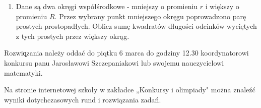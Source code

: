 \documentclass[10pt]{article}
\begin{document}
\begin{enumerate}
  \item Dane są dwa okręgi współśrodkowe - mniejszy o promieniu \(r\) i większy o promieniu \(R\). Przez wybrany punkt mniejszego okręgu poprowadzono parę prostych prostopadłych. Oblicz sumę kwadratów długości odcinków wyciętych z tych prostych przez większy okrąg.
\end{enumerate}

Rozwiq̨zania należy oddać do piqtku 6 marca do godziny 12.30 koordynatorowi konkursu panu Jarosławowi Szczepaniakowi lub swojemu nauczycielowi matematyki.

Na stronie internetowej szkoły w zakładce „Konkursy i olimpiady" można znaleźć wyniki dotychczasowych rund i rozwiązania zadań.
\end{document}
